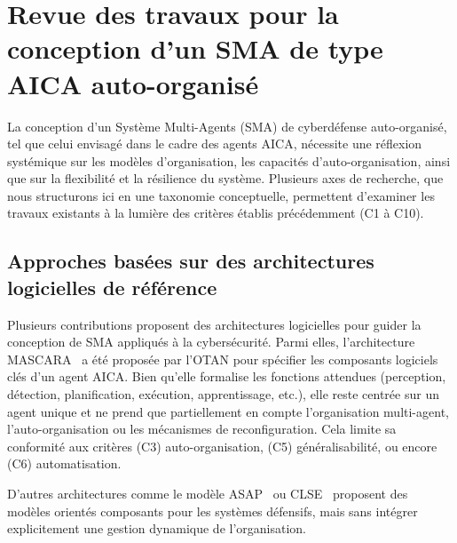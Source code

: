 \documentclass[ twoside,openright,titlepage,numbers=noenddot,headinclude,%
                footinclude=true,cleardoublepage=empty,abstractoff, %
                BCOR=5mm,paper=a4,fontsize=11pt,%
                french,american,%
                ]{scrreprt}
\begin{document}
\section{Revue des travaux pour la conception d'un SMA de type AICA auto-organisé}\label{sec:sma-conception-aica}

La conception d'un Système Multi-Agents (SMA) de cyberdéfense auto-organisé, tel que celui envisagé dans le cadre des agents AICA, nécessite une réflexion systémique sur les modèles d'organisation, les capacités d'auto-organisation, ainsi que sur la flexibilité et la résilience du système. Plusieurs axes de recherche, que nous structurons ici en une taxonomie conceptuelle, permettent d'examiner les travaux existants à la lumière des critères établis précédemment (C1 à C10).

\subsection*{Approches basées sur des architectures logicielles de référence}

Plusieurs contributions proposent des architectures logicielles pour guider la conception de SMA appliqués à la cybersécurité. Parmi elles, l'architecture MASCARA~\cite{mascara2020} a été proposée par l'OTAN pour spécifier les composants logiciels clés d'un agent AICA. Bien qu'elle formalise les fonctions attendues (perception, détection, planification, exécution, apprentissage, etc.), elle reste centrée sur un agent unique et ne prend que partiellement en compte l'organisation multi-agent, l'auto-organisation ou les mécanismes de reconfiguration. Cela limite sa conformité aux critères (C3) auto-organisation, (C5) généralisabilité, ou encore (C6) automatisation.

D'autres architectures comme le modèle ASAP~\cite{asap2017} ou CLSE~\cite{clse2016} proposent des modèles orientés composants pour les systèmes défensifs, mais sans intégrer explicitement une gestion dynamique de l'organisation.
\end{document}
